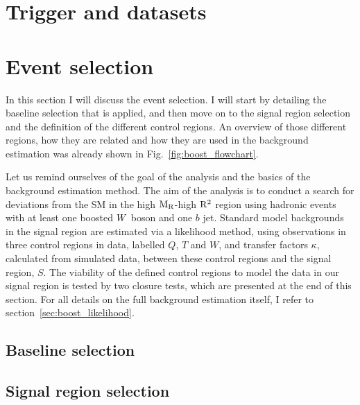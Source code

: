 


\section{Trigger and datasets \label{sec:trigger_datasets}}




\section{Event selection \label{sec:boost_event_selection}}

In this section I will discuss the event selection. I will start by detailing the baseline
selection that is applied, and then move on to the signal region selection and the definition of the
different control regions. 
An overview of those different regions, how they are related and how they are used in the
background estimation was already shown in Fig.~\ref{fig:boost_flowchart}. 

Let us remind ourselves of the goal of the analysis and the basics of the background estimation
method. 
The aim of the analysis is to conduct a search for deviations from the SM in the high $\mathrm{M_R}$-high
$\mathrm{R^2}$ region using hadronic events with at least one boosted $W$ boson and one $b$ jet.
Standard model backgrounds in the signal region are estimated via a likelihood method, using
observations in three control regions in data, labelled $Q$, $T$ and $W$, and transfer factors
$\kappa$, calculated from simulated data, between these control regions and the signal region,
$S$. 
The viability of the defined control regions to model the data in our signal region is tested by
two closure tests, which are presented at the end of this section.
For all details on the full background estimation itself, I refer to
section~\ref{sec:boost_likelihood}. 

\subsection{Baseline selection \label{sec:boost_baseline_selection}}



\subsection{Signal region selection \label{sec:boost_signal_selection}}

